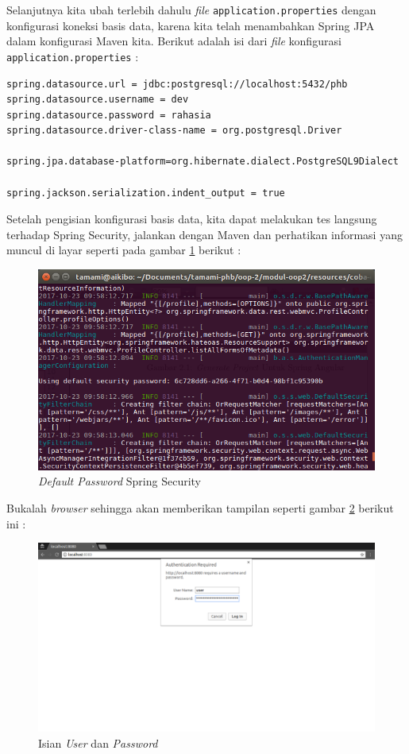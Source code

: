Selanjutnya kita ubah terlebih dahulu \textit{file} \texttt{application.properties} dengan konfigurasi koneksi basis data, karena kita telah menambahkan Spring JPA dalam konfigurasi Maven kita. Berikut adalah isi dari \textit{file} konfigurasi \texttt{application.properties} :

\begin{lstlisting}
spring.datasource.url = jdbc:postgresql://localhost:5432/phb
spring.datasource.username = dev
spring.datasource.password = rahasia
spring.datasource.driver-class-name = org.postgresql.Driver

spring.jpa.database-platform=org.hibernate.dialect.PostgreSQL9Dialect

spring.jackson.serialization.indent_output = true
\end{lstlisting}

Setelah pengisian konfigurasi basis data, kita dapat melakukan tes langsung terhadap Spring Security, jalankan dengan Maven dan perhatikan informasi yang muncul di layar seperti pada gambar \ref{fig:default-password} berikut :

\begin{figure}[H]
	\centering
	\includegraphics[width=1\textwidth]{./resources/017-default-pass}
	\caption{\textit{Default Password} Spring Security}
	\label{fig:default-password}
\end{figure}

Bukalah \textit{browser} sehingga akan memberikan tampilan seperti gambar \ref{fig:user-ask} berikut ini :

\begin{figure}[H]
	\centering
	\includegraphics[width=1\textwidth]{./resources/018-user-ask}
	\caption{Isian \textit{User} dan \textit{Password}}
	\label{fig:user-ask}
\end{figure}

